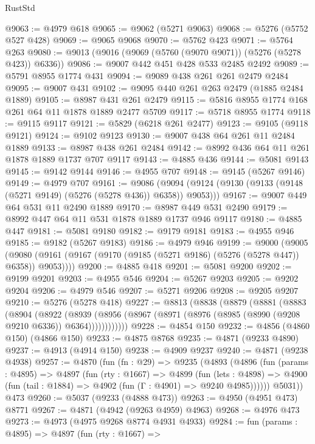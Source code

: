 \begin{lexlean}{RustStd}
\begin{coremodule}
@9063 := @4979 @618
@9065 := @9062 (@5271 @9063)
@9068 := @5276 (@5752 @527 @428)
@9069 := @9065 @9068
@9070 := @5762 @423
@9071 := @5764 @263
@9080 := @9013 (@9016 (@9069 (@5760 (@9070 @9071)) (@5276 (@5278 @423)) @6336))
@9086 := @9007 @442 @451 @428 @533 @2485 @2492
@9089 := @5791 @8955 @1774 @431
@9094 := @9089 @438 @261 @261 @2479 @2484
@9095 := @9007 @431
@9102 := @9095 @440 @261 @263 @2479 (@1885 @2484 @1889)
@9105 := @8987 @431 @261 @2479
@9115 := @5816 @8955 @1774 @168 @261 @64 @11 @1878 @1889 @2477 @5709
@9117 := @5718 @8955 @1774
@9118 := @9115 @9117
@9121 := @5829 (@6218 @261 @2477)
@9123 := @9105 (@9118 @9121)
@9124 := @9102 @9123
@9130 := @9007 @438 @64 @261 @11 @2484 @1889
@9133 := @8987 @438 @261 @2484
@9142 := @8992 @436 @64 @11 @261 @1878 @1889 @1737 @707 @9117
@9143 := @4885 @436
@9144 := @5081 @9143
@9145 := @9142 @9144
@9146 := @4955 @707
@9148 := @9145 (@5267 @9146)
@9149 := @4979 @707
@9161 := @9086
    (@9094 (@9124 (@9130 (@9133 (@9148 (@5271 @9149) (@5276 (@5278 @436)) @6358)) @9053)))
@9167 := @9007 @449 @64 @531 @11 @2490 @1889
@9170 := @8987 @449 @531 @2490
@9179 := @8992 @447 @64 @11 @531 @1878 @1889 @1737 @946 @9117
@9180 := @4885 @447
@9181 := @5081 @9180
@9182 := @9179 @9181
@9183 := @4955 @946
@9185 := @9182 (@5267 @9183)
@9186 := @4979 @946
@9199 := @9000
    (@9005 (@9080 (@9161 (@9167 (@9170 (@9185 (@5271 @9186) (@5276 (@5278 @447)) @6358)) @9053))))
@9200 := @4885 @418
@9201 := @5081 @9200
@9202 := @9199 @9201
@9203 := @4955 @546
@9204 := @5267 @9203
@9205 := @9202 @9204
@9206 := @4979 @546
@9207 := @5271 @9206
@9208 := @9205 @9207
@9210 := @5276 (@5278 @418)
@9227 := @8813
    (@8838
      (@8879
        (@8881
          (@8883
            (@8904
              (@8922
                (@8939
                  (@8956 (@8967 (@8971 (@8976 (@8985 (@8990 (@9208 @9210 @6336)) @6364))))))))))))
@9228 := @4854 @150
@9232 := @4856 (@4860 @150) (@4866 @150)
@9233 := @4875 @8768
@9235 := @4871 (@9233 @4890)
@9237 := @4913 (@4914 @150)
@9238 := @4909 @9237
@9240 := @4871 (@9238 @4938)
@9257 := @4870
    (fun (fn : @29) =>
    @9235
      (@4893
        (@4896
          (fun (params : @4895) =>
          @4897
            (fun (rty : @1667) =>
            @4899
              (fun (lets : @4898) =>
              @4900 (fun (tail : @1884) => @4902 (fun (Γ : @4901) => @9240 @4985))))))
        @5031))
    @473
@9260 := @5037 (@9233 (@4888 @473))
@9263 := @4950 (@4951 @473) @8771
@9267 := @4871 (@4942 (@9263 @4959) @4963)
@9268 := @4976 @473
@9273 := @4973 (@4975 @9268 @8774 @4931 @4933)
@9284 := fun (params : @4895) =>
  @4897
    (fun (rty : @1667) =>

\end{coremodule}
\end{lexlean}
